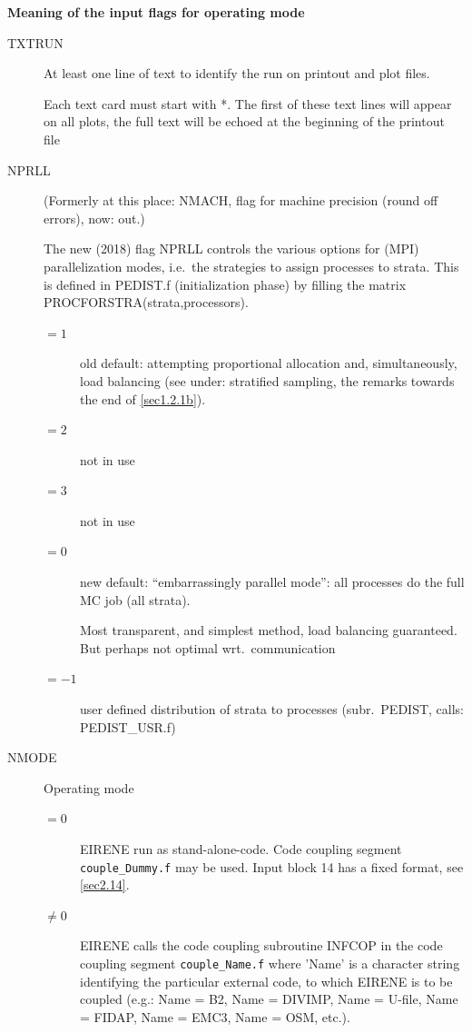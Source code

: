 \textbf{Meaning of the input flags for operating mode} 

\medskip 

\begin{description}
  \item[TXTRUN] At least one line of text to identify the run
        on printout and plot files.

        Each text card must start with *.
        The first of these text lines will appear on all plots, the full text will be
        echoed at the beginning of the printout file
  \item[NPRLL] (Formerly at this
        place: NMACH, flag for machine precision (round off errors), now: out.)

        The new (2018) flag NPRLL controls the various options for (MPI)
        parallelization modes, i.e.\ the strategies to assign processes  to strata.
        This is defined in PEDIST.f (initialization phase) by filling the matrix
        PROCFORSTRA(strata,processors).
        \begin{description}
          \item[$= 1$] old default: attempting proportional allocation and,
                simultaneously, load balancing (see under: stratified sampling, the remarks
                towards the end of \cref{sec1.2.1b}).
          \item[$= 2$] not in use
          \item[$= 3$] not in use
          \item[$= 0$] new default:
                ``embarrassingly parallel mode'': all processes do the full MC job (all
                strata).

                Most transparent, and simplest method, load balancing guaranteed.
                But perhaps not optimal wrt.\ communication
          \item[$= -1$] user defined
                distribution of strata to processes (subr.\ PEDIST, calls: PEDIST\_USR.f)
        \end{description}

  \item[NMODE] Operating mode
        \begin{description}
          \item[$= 0$] EIRENE run as
                stand-alone-code.
                Code coupling segment \lstinline|couple_Dummy.f| may be used.
                Input block 14 has a fixed format, see \cref{sec2.14}.
          \item[$\ne 0$] EIRENE calls the code coupling subroutine INFCOP in the code
                coupling segment \lstinline|couple_Name.f| where 'Name' is a character string
                identifying the particular external code, to which EIRENE is to be coupled
                (e.g.: Name = B2, Name = DIVIMP, Name = U-file, Name = FIDAP, Name = EMC3, Name
                = OSM, etc.).


\end{description}
\end{description}

